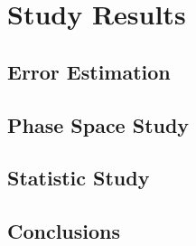 \section{Study Results}
\begin{frame}{}
    \centering \Huge{}
\end{frame}

\subsection{Error Estimation}

\subsection{Phase Space Study}

\subsection{Statistic Study}

\subsection{Conclusions}
